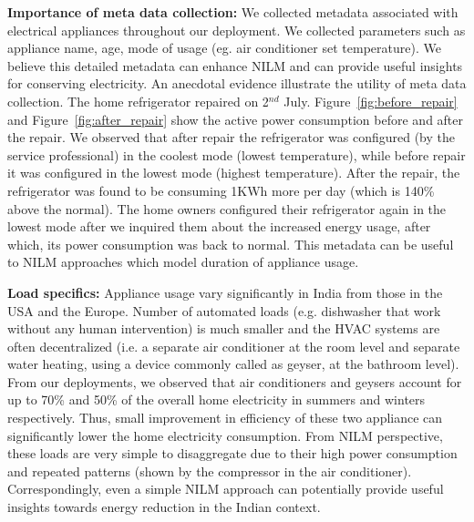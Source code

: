 \documentclass[10pt]{sensys-proc}
\newcommand{\redcolor}[1]{\textcolor{red}{#1}}
\newcommand{\figref}[1]{Figure~\ref{#1}}
\begin{document}
\noindent \textbf{Importance of meta data collection:} We collected metadata associated with electrical appliances throughout our deployment. We collected parameters such as appliance name, age, mode of usage (eg. air conditioner set temperature). We believe this detailed metadata can enhance NILM and can provide useful insights for conserving electricity. An anecdotal evidence illustrate the utility of meta data collection. The home refrigerator repaired on 2$^{nd}$ July. \figref{fig:before_repair} and \figref{fig:after_repair} show the active power consumption before and after the repair. We observed that after repair the refrigerator was configured (by the service professional) in the coolest mode (lowest temperature), while before repair it was configured in the lowest mode (highest temperature). After the repair, the refrigerator was found to be consuming 1KWh more per day (which is 140\% above the normal). The home owners configured their refrigerator again in the lowest mode after we inquired them about the increased energy usage, after which, its power consumption was back to normal. 
This metadata can be useful to NILM approaches which model duration of appliance usage. 

\noindent \textbf{Load specifics:} Appliance usage vary significantly in India from those in the USA and the Europe. Number of automated loads (e.g. dishwasher that work without any human intervention) is much smaller and the HVAC systems are often decentralized (i.e. a separate air conditioner at the room level and separate water heating, using a device commonly called as geyser, at the bathroom level). From our deployments, we observed that air conditioners and geysers account for up to 70\% and 50\% of the overall home electricity in summers and winters respectively. Thus, small improvement in efficiency of these two appliance can significantly lower the home electricity consumption. From NILM perspective, these loads are very simple to disaggregate due to their high power consumption and repeated patterns (shown by the compressor in the air conditioner). Correspondingly, even a simple NILM approach can potentially provide useful insights towards energy reduction in the Indian context.
\end{document}
